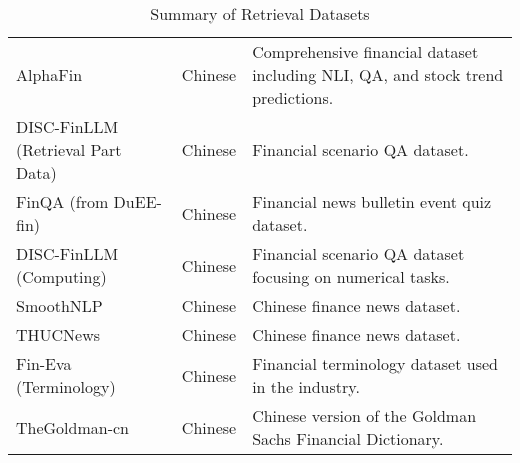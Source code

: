 \begin{table*}[htbp]
{\begin{tabular}{p{5cm}p{1.5cm}p{8cm}}
AlphaFin \citep{alphafin}& Chinese& Comprehensive financial dataset including NLI, QA, and stock trend predictions. \\

DISC-FinLLM (Retrieval Part Data) \citep{disc}& Chinese& Financial scenario QA dataset. \\

FinQA (from DuEE-fin) \citep{bbt}& Chinese& Financial news bulletin event quiz dataset. \\

DISC-FinLLM (Computing) \citep{disc}& Chinese& Financial scenario QA dataset focusing on numerical tasks. \\

SmoothNLP \tablefootnote{\url{https://github.com/smoothnlp/SmoothNLP}} & Chinese& Chinese finance news dataset. \\

THUCNews \citep{thuctc}& Chinese& Chinese finance news dataset. \\

Fin-Eva (Terminology) \tablefootnote{\url{https://github.com/alipay/financial_evaluation_dataset/tree/main}} & Chinese& Financial terminology dataset used in the industry. \\
TheGoldman-cn & Chinese& Chinese version of the Goldman Sachs Financial Dictionary. \\
\bottomrule
\end{tabular}
}
\caption{Summary of Retrieval Datasets}
\label{tab:retrieval_ds}
\end{table*}


